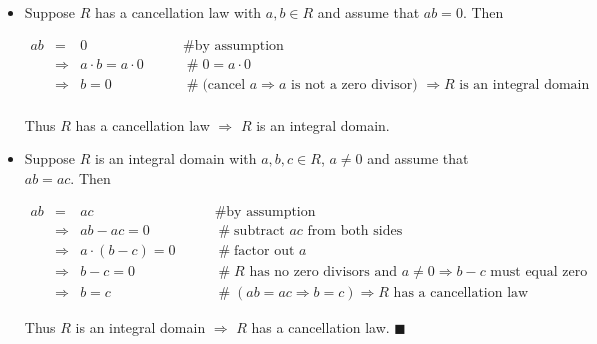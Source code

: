 \documentclass{article}
\theoremstyle{definition}
\begin{document}
\begin{itemize}
\item [($\Rightarrow$)] Suppose $R$ has a cancellation law 
with $a,b \in R$ and assume that $ab = 0$. Then

\vspace{-0.25cm}															%
\begin{equation*}
\begin{array}{rcll} 
ab
&=& 0 								
			&\hspace{2em} \mathrel{\#} \text{by assumption} \\
[5pt]
&\Rightarrow& a \cdot b = a \cdot 0 
			&\hspace{2em} \mathrel{\#} 0 = a \cdot 0 \\
[5pt]
&\Rightarrow& b = 0 				
			&\hspace{2em} \mathrel{\#} \text{(cancel 
			$a \Rightarrow a$ is not a zero divisor) 
			$\Rightarrow R$ is an integral domain} \\
\end{array}
\end{equation*}

\medskip
\noindent
Thus $R$ has a cancellation law $\Rightarrow$ $R$ is an integral 
domain.

\medskip
\noindent
\item [($\Leftarrow$)] Suppose $R$ is an integral domain with $a,b,c \in R$, 
$a \neq 0$ and assume that $ab = ac$. Then 

\begin{equation*}
\begin{array}{rcll} 
ab
&=& ac                                                  
			&\hspace{2em} \mathrel{\#} \text{by assumption} \\
[5pt]
&\Rightarrow& ab-ac = 0
			&\hspace{2em} \mathrel{\#} \text{subtract $ac$ from both sides} \\
[5pt]
&\Rightarrow& a\cdot(b-c) = 0
			&\hspace{2em} \mathrel{\#} \text{factor out $a$} \\
[5pt]
&\Rightarrow& b-c = 0
			&\hspace{2em} \mathrel{\#} \text{$R$ has no zero divisors and 
				$a \neq 0 \Rightarrow b-c$ must equal zero} \\
[5pt]
&\Rightarrow& b = c 
			&\hspace{2em} \mathrel{\#} \text{$(ab=ac \Rightarrow b = c)
			\Rightarrow R$ has a cancellation law}
\end{array}
\end{equation*}

\medskip
\noindent
Thus $R$ is an integral domain $\Rightarrow$ $R$ has a cancellation 
law. $\blacksquare$
\end{itemize}
\end{document}
